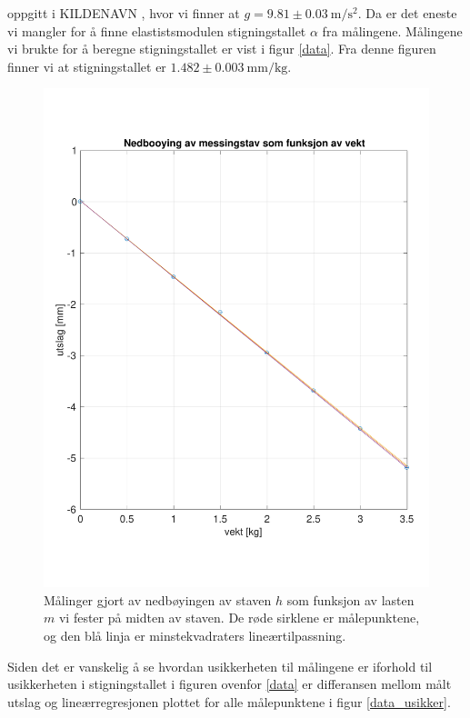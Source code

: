\documentclass[%
 reprint,
 amsmath,amssymb,
 aps,
 norsk,
 booktabs
]{revtex4-1}
\begin{document}
oppgitt i KILDENAVN \cite{tyngde}, hvor vi finner at $g=9.81\pm\SI{0.03}{\meter\per\second^2}$. Da er det eneste vi mangler for å finne elastistsmodulen stigningstallet $\alpha$ fra målingene. Målingene vi brukte for å beregne stigningstallet er vist i figur \vref{data}. Fra denne figuren finner vi at stigningstallet er $1.482\pm\SI{0.003}{\milli\meter\per\kilo\gram}$.
\begin{figure}[h!]
  \centering
  \includegraphics[scale=0.4]{nedbojing.pdf}
  \caption{Målinger gjort av nedbøyingen av staven $h$ som funksjon av lasten $m$ vi fester på midten av staven. De røde sirklene er målepunktene, og den blå linja er minstekvadraters lineærtilpassning.}
  \label{data}
\end{figure}
Siden det er vanskelig å se hvordan usikkerheten til målingene er iforhold til usikkerheten i stigningstallet i figuren ovenfor \vref{data} er differansen mellom målt utslag og lineærregresjonen plottet for alle målepunktene i figur \vref{data_usikker}.
\end{document}
